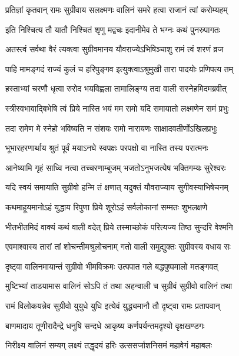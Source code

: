 \twolineshloka
{प्रतिज्ञां कृतवान् रामः सुग्रीवाय सलक्ष्मणः}
{वालिनं समरे हत्वा राजानं त्वां करोम्यहम्} %

\twolineshloka
{इति निश्चित्य तौ यातौ निश्चितं शृणु मद्वचः}
{इदानीमेव ते भग्नः कथं पुनरुपागतः} %

\twolineshloka
{अतस्त्वं सर्वथा वैरं त्यक्त्वा सुग्रीवमानय}
{यौवराज्येऽभिषिञ्चाशु रामं त्वं शरणं व्रज} %

\twolineshloka
{पाहि मामङ्गदं राज्यं कुलं च हरिपुङ्गव}
{इत्युक्त्वाऽश्रुमुखी तारा पादयोः प्रणिपत्य तम्} %

\twolineshloka
{हस्ताभ्यां चरणौ धृत्वा रुरोद भयविह्वला}
{तामालिङ्ग्य तदा वाली सस्नेहमिदमब्रवीत्} %

\twolineshloka
{स्त्रीस्वभावाद्बिभेषि त्वं प्रिये नास्ति भयं मम}
{रामो यदि समायातो लक्ष्मणेन समं प्रभुः} %

\twolineshloka
{तदा रामेण मे स्नेहो भविष्यति न संशयः}
{रामो नारायणः साक्षादवतीर्णोऽखिलप्रभुः} %

\twolineshloka
{भूभारहरणार्थाय श्रुतं पूर्वं मयाऽनघे}
{स्वपक्षः परपक्षो वा नास्ति तस्य परात्मनः} %

\twolineshloka
{आनेष्यामि गृहं साध्वि नत्वा तच्चरणाम्बुजम्}
{भजतोऽनुभजत्येष भक्तिगम्यः सुरेश्वरः} %

\twolineshloka
{यदि स्वयं समायाति सुग्रीवो हन्मि तं क्षणात्}
{यदुक्तं यौवराज्याय सुगीवस्याभिषेचनम्} %

\twolineshloka
{कथमाहूयमानोऽहं युद्धाय रिपुणा प्रिये}
{शूरोऽहं सर्वलोकानां सम्मतः शुभलक्षणे} %

\twolineshloka
{भीतभीतमिदं वाक्यं कथं वाली वदेत् प्रिये}
{तस्माच्छोकं परित्यज्य तिष्ठ सुन्दरि वेश्मनि} %

\twolineshloka
{एवमाश्वास्य तारां तां शोचन्तीमश्रुलोचनाम्}
{गतो वाली समुद्युक्तः सुग्रीवस्य वधाय सः} %

\twolineshloka
{दृष्ट्वा वालिनमायान्तं सुग्रीवो भीमविक्रमः}
{उत्पपात गले बद्धपुष्पमालो मतङ्गवत्} %

\twolineshloka
{मुष्टिभ्यां ताडयामास वालिनं सोऽपि तं तथा}
{अहन्वाली च सुग्रीवं सुग्रीवो वालिनं तथा} %

\twolineshloka
{रामं विलोकयन्नेव सुग्रीवो युयुधे युधि}
{इत्येवं युद्ध्यमानौ तौ दृष्ट्वा रामः प्रतापवान्} %

\twolineshloka
{बाणमादाय तूणीरादैन्द्रे धनुषि सन्दधे}
{आकृष्य कर्णपर्यन्तमदृश्यो वृक्षखण्डगः} %

\twolineshloka
{निरीक्ष्य वालिनं सम्यग् लक्ष्यं तद्धृदयं हरिः}
{उत्ससर्जाशनिसमं महावेगं महाबलः} %

